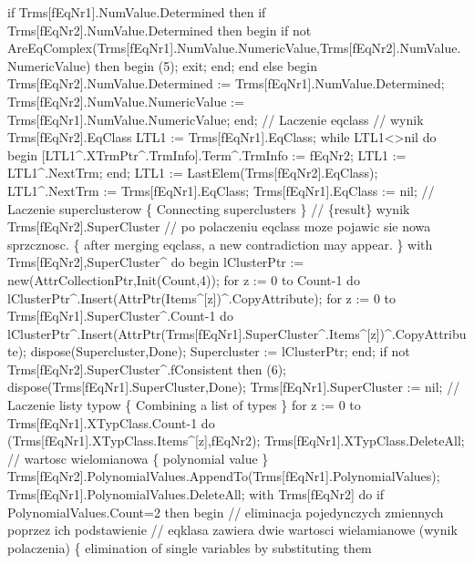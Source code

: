       if Trms[fEqNr1].NumValue.Determined then
         if Trms[fEqNr2].NumValue.Determined then
         begin
            if not AreEqComplex(Trms[fEqNr1].NumValue.NumericValue,Trms[fEqNr2].NumValue.NumericValue) then
            begin
               (5);
               exit;
            end;
         end
         else
         begin
            Trms[fEqNr2].NumValue.Determined := Trms[fEqNr1].NumValue.Determined;
            Trms[fEqNr2].NumValue.NumericValue := Trms[fEqNr1].NumValue.NumericValue;
         end;
      //    Laczenie eqclass
      //    wynik Trms[fEqNr2].EqClass
      LTL1 := Trms[fEqNr1].EqClass;
      while LTL1<>nil do
      begin
         [LTL1^.XTrmPtr^.TrmInfo].Term^.TrmInfo := fEqNr2;
         LTL1 := LTL1^.NextTrm;
      end;
      LTL1 := LastElem(Trms[fEqNr2].EqClass);
      LTL1^.NextTrm := Trms[fEqNr1].EqClass;
      Trms[fEqNr1].EqClass := nil;
      // Laczenie superclusterow \{ Connecting superclusters \}
      // \{result\} wynik Trms[fEqNr2].SuperCluster
      // po polaczeniu eqclass moze pojawic sie nowa sprzcznosc.
      \{ after merging eqclass, a new contradiction may appear. \}
      with Trms[fEqNr2],SuperCluster^ do
      begin
         lClusterPtr := new(AttrCollectionPtr,Init(Count,4));
         for z := 0 to Count-1 do
            lClusterPtr^.Insert(AttrPtr(Items^[z])^.CopyAttribute);
         for z := 0 to Trms[fEqNr1].SuperCluster^.Count-1 do
            lClusterPtr^.Insert(AttrPtr(Trms[fEqNr1].SuperCluster^.Items^[z])^.CopyAttribute);
         dispose(Supercluster,Done);
         Supercluster := lClusterPtr;
      end;
      if not Trms[fEqNr2].SuperCluster^.fConsistent then (6);
      dispose(Trms[fEqNr1].SuperCluster,Done);
      Trms[fEqNr1].SuperCluster := nil;
      //   Laczenie listy typow \{ Combining a list of types \}
      for z := 0 to Trms[fEqNr1].XTypClass.Count-1 do
         (Trms[fEqNr1].XTypClass.Items^[z],fEqNr2);
      Trms[fEqNr1].XTypClass.DeleteAll;
      //    wartosc wielomianowa \{ polynomial value \}
      Trms[fEqNr2].PolynomialValues.AppendTo(Trms[fEqNr1].PolynomialValues);
      Trms[fEqNr1].PolynomialValues.DeleteAll;
      with Trms[fEqNr2] do
         if PolynomialValues.Count=2 then
         begin
            // eliminacja pojedynczych zmiennych poprzez ich podstawienie
            // eqklasa zawiera dwie wartosci wielamianowe (wynik polaczenia)
            \{ elimination of single variables by substituting them
